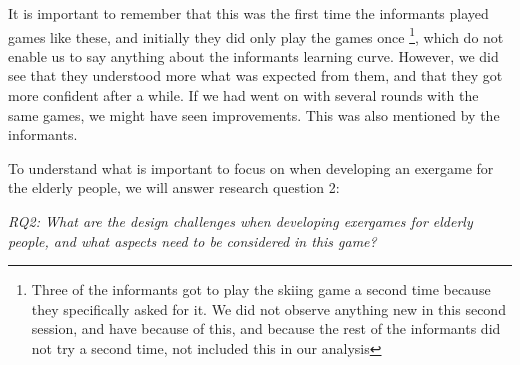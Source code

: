 It is important to remember that this was the first time the informants played games like these, and initially they did only play the games once \footnote{Three of the informants got to play the skiing game a second time because they specifically asked for it. We did not observe anything new in this second session, and have because of this, and because the rest of the informants did not try a second time, not included this in our analysis}, which do not enable us to say anything about the informants learning curve. However, we did see that they understood more what was expected from them, and that they got more confident after a while. If we had went on with several rounds with the same games, we might have seen improvements. This was also mentioned by the informants. 

To understand what is important to focus on when developing an exergame for the elderly people, we will answer research question 2:

\emph{RQ2: What are the design challenges when developing exergames for elderly people, and what aspects need to be considered in this game?}


